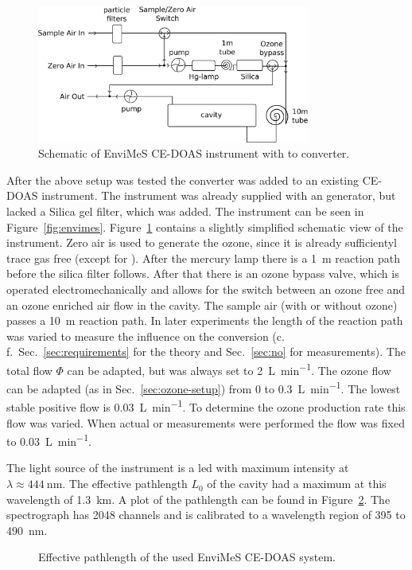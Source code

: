 \begin{figure}[htbp]
  \centering
  \includegraphics[width=0.8\textwidth]{images/envimes_setup.eps}
  \caption{Schematic of EnviMeS CE-DOAS instrument with  to
     converter.}
  \label{fig:envimes-schematic}
\end{figure}

After the above setup was tested the converter was added to an
existing CE-DOAS instrument. The instrument was already supplied with
an  generator, but lacked a Silica gel filter, which was
added. The instrument can be seen in
Figure~\ref{fig:envimes}. Figure~\ref{fig:envimes-schematic} contains
a slightly simplified schematic view of the instrument. Zero air is
used to generate the ozone, since it is already sufficientyl trace gas
free (except for ). After the mercury lamp there is a
\SI{1}{\meter} reaction path before the silica filter follows. After
that there is an ozone bypass valve, which is operated
electromechanically and allows for the switch between an ozone free and
an ozone enriched air flow in the cavity. The sample air (with or
without ozone) passes a \SI{10}{\meter} reaction path. In later
experiments the length of the reaction path was varied to measure the
influence on the  conversion (c.\,f.\
Sec.~\ref{sec:requirements} for the theory and Sec.~\ref{sec:no} for
measurements). The total flow $\Phi$ can be adapted, but was always
set to \SI{2}{\liter\per\minute}. The ozone flow can be adapted (as
in Sec.~\ref{sec:ozone-setup}) from 0 to
\SI{0.3}{\liter\per\minute}. The lowest stable positive flow is
\SI{0.03}{\liter\per\minute}. To determine the ozone production rate
this flow was varied. When actual \ch{NO} or \ch{NO_x} measurements
were performed the flow was fixed to \SI{0.03}{\liter\per\minute}.

The light source of the instrument is a led with maximum intensity at
$\lambda \approx \SI{444}{\nano\meter}$. The effective pathlength
$L_0$ of the cavity had a maximum at this wavelength of
\SI{1.3}{\kilo\meter}. A plot of the pathlength can be found in
Figure~\ref{fig:pathlength}. The spectrograph has \num{2048} channels
and is calibrated to a wavelength region of \num{395} to
\SI{490}{\nano\meter}.

\begin{figure}[htbp]
  \centering
  
  \caption{Effective pathlength of the used EnviMeS CE-DOAS system.}
  \label{fig:pathlength}
\end{figure}

